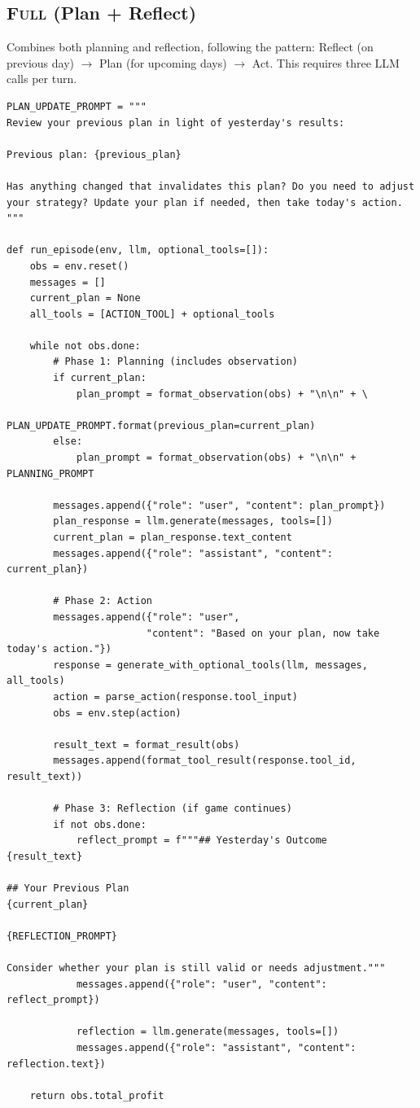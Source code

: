 \subsection{\textsc{Full} (Plan + Reflect)}

Combines both planning and reflection, following the pattern: Reflect (on previous day) $\rightarrow$ Plan (for upcoming days) $\rightarrow$ Act. This requires three LLM calls per turn.

\begin{verbatim}
PLAN_UPDATE_PROMPT = """
Review your previous plan in light of yesterday's results:

Previous plan: {previous_plan}

Has anything changed that invalidates this plan? Do you need to adjust 
your strategy? Update your plan if needed, then take today's action.
"""

def run_episode(env, llm, optional_tools=[]):
    obs = env.reset()
    messages = []
    current_plan = None
    all_tools = [ACTION_TOOL] + optional_tools
    
    while not obs.done:
        # Phase 1: Planning (includes observation)
        if current_plan:
            plan_prompt = format_observation(obs) + "\n\n" + \
                         PLAN_UPDATE_PROMPT.format(previous_plan=current_plan)
        else:
            plan_prompt = format_observation(obs) + "\n\n" + PLANNING_PROMPT
        
        messages.append({"role": "user", "content": plan_prompt})
        plan_response = llm.generate(messages, tools=[])
        current_plan = plan_response.text_content
        messages.append({"role": "assistant", "content": current_plan})
        
        # Phase 2: Action
        messages.append({"role": "user", 
                        "content": "Based on your plan, now take today's action."})
        response = generate_with_optional_tools(llm, messages, all_tools)
        action = parse_action(response.tool_input)
        obs = env.step(action)
        
        result_text = format_result(obs)
        messages.append(format_tool_result(response.tool_id, result_text))
        
        # Phase 3: Reflection (if game continues)
        if not obs.done:
            reflect_prompt = f"""## Yesterday's Outcome
{result_text}

## Your Previous Plan
{current_plan}

{REFLECTION_PROMPT}

Consider whether your plan is still valid or needs adjustment."""
            messages.append({"role": "user", "content": reflect_prompt})
            
            reflection = llm.generate(messages, tools=[])
            messages.append({"role": "assistant", "content": reflection.text})
    
    return obs.total_profit
\end{verbatim}

